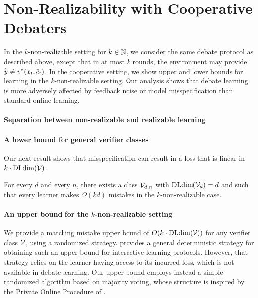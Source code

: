 \documentclass[anon]{alt2027} %
\begin{document}
\fi

\section{Non-Realizability with Cooperative Debaters}

In the $k$-non-realizable setting for $k \in \mathbb{N}$, we consider the same debate protocol as described above, except that in at most $k$ rounds, the environment may provide ${\widetilde{y}} \neq v^*(x_t, \bar{c}_t)$. In the cooperative setting, we show upper and lower bounds for learning in the $k$-non-realizable setting. Our analysis shows that debate learning is more adversely affected by feedback noise or model misspecification than standard online learning.

\paragraph{Separation between non-realizable and realizable learning}
\label{sec:agnostic-example}





\paragraph{A lower bound for general verifier classes}
Our next result shows that %
misspecification can result in a loss that is linear in $k\cdot \mathrm{DLdim}({\mathcal V})$.
\begin{theorem}\label{thm:kdlower}
    For every $d$ and every $n$, there exists a class ${\mathcal V}_{d,n}$ with $\mathrm{DLdim}({\mathcal V}_d)=d$ and such that every %
    learner makes $\Omega(kd)$ mistakes in the $k$-non-realizable case.
\end{theorem}

\paragraph{An upper bound for the $k$-non-realizable setting}
We provide a matching mistake upper bound of $O(k\cdot \mathrm{DLdim}({\mathcal V}))$ for any verifier class ${\mathcal V}$, using a randomized strategy. \cite{oz2026discriminative} provides a general deterministic strategy for obtaining such an upper bound for interactive learning protocols. However, that strategy relies on the learner having access to its incurred loss, which is not available in debate learning. 
Our upper bound employs instead a simple randomized algorithm based on majority voting, whose structure is inspired by the Private Online Procedure of \cite{kaplan2023black}. 
\end{document}
